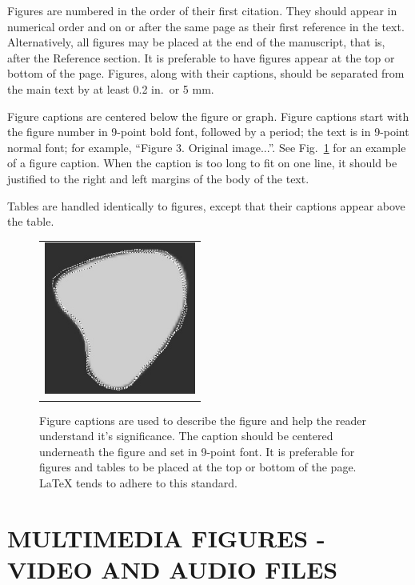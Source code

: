 \documentclass[]{spie}  %
\begin{document}
Figures are numbered in the order of their first citation.  They should appear in numerical order and on or after the same page as their first reference in the text.  Alternatively, all figures may be placed at the end of the manuscript, that is, after the Reference section.  It is preferable to have figures appear at the top or bottom of the page.  Figures, along with their captions, should be separated from the main text by at least 0.2 in.\ or 5 mm.  

Figure captions are centered below the figure or graph.  Figure captions start with the figure number in 9-point bold font, followed by a period; the text is in 9-point normal font; for example, ``{\footnotesize{Figure 3.}  Original image...}''.  See Fig.~\ref{fig:example} for an example of a figure caption.  When the caption is too long to fit on one line, it should be justified to the right and left margins of the body of the text.  

Tables are handled identically to figures, except that their captions appear above the table. 

   \begin{figure} [ht]
   \begin{center}
   \begin{tabular}{c} %
   \includegraphics[height=5cm]{mcr3b.eps}
   \end{tabular}
   \end{center}
   \caption[example] 
   { \label{fig:example} 
Figure captions are used to describe the figure and help the reader understand it's significance.  The caption should be centered underneath the figure and set in 9-point font.  It is preferable for figures and tables to be placed at the top or bottom of the page. LaTeX tends to adhere to this standard.}
   \end{figure} 

\section{MULTIMEDIA FIGURES - VIDEO AND AUDIO FILES}
\end{document}
